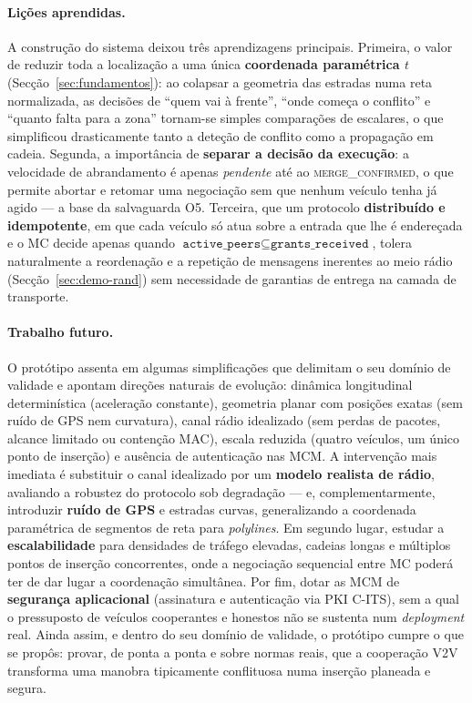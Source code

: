 \documentclass[11pt,a4paper]{article}
\begin{document}
\paragraph{Lições aprendidas.} A construção do sistema deixou três aprendizagens
principais. Primeira, o valor de reduzir toda a localização a uma única \textbf{coordenada
paramétrica $t$} (Secção~\ref{sec:fundamentos}): ao colapsar a geometria das estradas numa
reta normalizada, as decisões de ``quem vai à frente'', ``onde começa o conflito'' e
``quanto falta para a zona'' tornam-se simples comparações de escalares, o que simplificou
drasticamente tanto a deteção de conflito como a propagação em cadeia. Segunda, a
importância de \textbf{separar a decisão da execução}: a velocidade de abrandamento é
apenas \emph{pendente} até ao \textsc{merge\_confirmed}, o que permite abortar e retomar
uma negociação sem que nenhum veículo tenha já agido --- a base da salvaguarda O5.
Terceira, que um protocolo \textbf{distribuído e idempotente}, em que cada veículo só atua
sobre a entrada que lhe é endereçada e o MC decide apenas quando
$\texttt{active\_peers}\subseteq\texttt{grants\_received}$, tolera naturalmente a
reordenação e a repetição de mensagens inerentes ao meio rádio (Secção~\ref{sec:demo-rand})
sem necessidade de garantias de entrega na camada de transporte.

\paragraph{Trabalho futuro.} O protótipo assenta em algumas simplificações que delimitam o
seu domínio de validade e apontam direções naturais de evolução: dinâmica longitudinal
determinística (aceleração constante), geometria planar com
posições exatas (sem ruído de GPS nem curvatura), canal rádio idealizado (sem perdas de
pacotes, alcance limitado ou contenção MAC), escala reduzida (quatro veículos, um único
ponto de inserção) e ausência de autenticação nas MCM. A intervenção mais imediata é
substituir o canal idealizado por um \textbf{modelo realista de rádio}, avaliando a
robustez do protocolo sob degradação --- e, complementarmente, introduzir \textbf{ruído de
GPS} e estradas curvas, generalizando a coordenada paramétrica de segmentos de reta para
\emph{polylines}. Em segundo lugar, estudar a \textbf{escalabilidade} para densidades de
tráfego elevadas, cadeias longas e múltiplos pontos de inserção concorrentes, onde a
negociação sequencial entre MC poderá ter de dar lugar a coordenação simultânea. Por fim,
dotar as MCM de \textbf{segurança aplicacional} (assinatura e autenticação via PKI C-ITS),
sem a qual o pressuposto de veículos cooperantes e honestos não se sustenta num
\emph{deployment} real. Ainda assim, e dentro do seu domínio de validade, o protótipo
cumpre o que se propôs: provar, de ponta a ponta e sobre normas reais, que a cooperação
V2V transforma uma manobra tipicamente conflituosa numa inserção planeada e segura.



\end{document}
